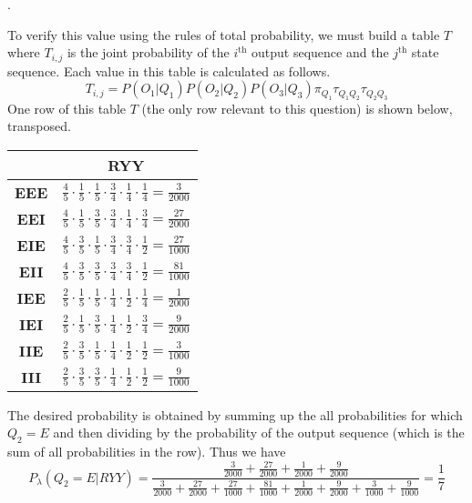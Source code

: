 \documentclass[a4paper, 10pt]{article}
\newcounter{prob_num}
\newcommand{\problem}{\vspace{20pt}\arabic{prob_num}.\stepcounter{prob_num}\par}
\begin{document}
\problem

To verify this value using the rules of total probability, we must build a table $T$ where $T_{i,j}$ is the joint probability of the $i^{\text{th}}$ output sequence and the $j^{\text{th}}$ state sequence. Each value in this table is calculated as follows. \[ T_{i,j} = P(O_1|Q_1)P(O_2|Q_2)P(O_3|Q_3)\pi_{Q_1}\tau_{Q_1 Q_2}\tau_{Q_2 Q_3} \] One row of this table $T$ (the only row relevant to this question) is shown below, transposed.

\renewcommand{\arraystretch}{2}
\begin{center}
\begin{tabular}{|c|c|}
  \hline
               & \textbf{RYY} \\
  \hline
  \textbf{EEE} & $\frac{4}{5}\cdot\frac{1}{5}\cdot\frac{1}{5}\cdot\frac{3}{4}\cdot\frac{1}{4}\cdot\frac{1}{4} = \frac{3}{2000} $ \\
  \textbf{EEI} & $\frac{4}{5}\cdot\frac{1}{5}\cdot\frac{3}{5}\cdot\frac{3}{4}\cdot\frac{1}{4}\cdot\frac{3}{4} = \frac{27}{2000}$ \\
  \textbf{EIE} & $\frac{4}{5}\cdot\frac{3}{5}\cdot\frac{1}{5}\cdot\frac{3}{4}\cdot\frac{3}{4}\cdot\frac{1}{2} = \frac{27}{1000}$ \\
  \textbf{EII} & $\frac{4}{5}\cdot\frac{3}{5}\cdot\frac{3}{5}\cdot\frac{3}{4}\cdot\frac{3}{4}\cdot\frac{1}{2} = \frac{81}{1000}$ \\
  \textbf{IEE} & $\frac{2}{5}\cdot\frac{1}{5}\cdot\frac{1}{5}\cdot\frac{1}{4}\cdot\frac{1}{2}\cdot\frac{1}{4} = \frac{1}{2000} $ \\
  \textbf{IEI} & $\frac{2}{5}\cdot\frac{1}{5}\cdot\frac{3}{5}\cdot\frac{1}{4}\cdot\frac{1}{2}\cdot\frac{3}{4} = \frac{9}{2000} $ \\
  \textbf{IIE} & $\frac{2}{5}\cdot\frac{3}{5}\cdot\frac{1}{5}\cdot\frac{1}{4}\cdot\frac{1}{2}\cdot\frac{1}{2} = \frac{3}{1000} $ \\
  \textbf{III} & $\frac{2}{5}\cdot\frac{3}{5}\cdot\frac{3}{5}\cdot\frac{1}{4}\cdot\frac{1}{2}\cdot\frac{1}{2} = \frac{9}{1000} $ \\
  \hline
\end{tabular}
\end{center}
\renewcommand{\arraystretch}{1}

The desired probability is obtained by summing up the all probabilities for which $Q_2 = E$ and then dividing by the probability of the output sequence (which is the sum of all probabilities in the row). Thus we have
\[ P_{\lambda}(Q_2 = E|RYY) = \frac{\frac{3}{2000}+\frac{27}{2000}+\frac{1}{2000}+\frac{9}{2000}}{\frac{3}{2000}+\frac{27}{2000}+\frac{27}{1000}+\frac{81}{1000}+\frac{1}{2000}+\frac{9}{2000}+\frac{3}{1000}+\frac{9}{1000}} = \frac{1}{7} \]
\end{document}
